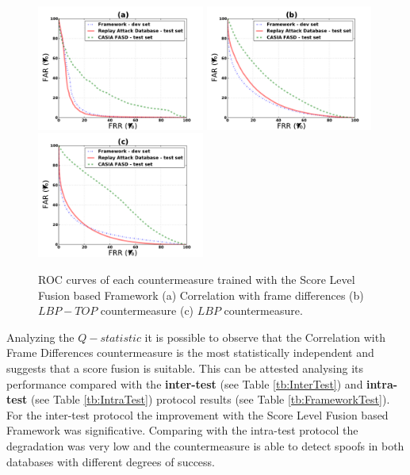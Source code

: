 \begin{figure}[ht]
\begin{center}

\includegraphics [width=5.5cm] {plots/FRAMEWORK/MOTION/SUM.pdf} 
\includegraphics [width=5.5cm] {plots/FRAMEWORK/LBPTOP/SUM.pdf}
\includegraphics [width=5.5cm] {plots/FRAMEWORK/LBP/SUM.pdf}

\caption{ROC curves of each countermeasure trained with the Score Level Fusion based Framework (a) Correlation with frame differences (b) $LBP-TOP$ countermeasure (c) $LBP$ countermeasure.} 
\label{fig:ROC_framework}
\end{center}
\end{figure}

Analyzing the $Q-statistic$ it is  possible to observe that the Correlation with Frame Differences countermeasure is the most statistically independent and suggests that a score fusion is suitable. This can be attested analysing its performance compared with the \textbf{inter-test} (see Table \ref{tb:InterTest}) and \textbf{intra-test} (see Table \ref{tb:IntraTest}) protocol results (see Table \ref{tb:FrameworkTest}). For the inter-test protocol the improvement with the Score Level Fusion based Framework was significative. Comparing with the intra-test protocol the degradation was very low and the countermeasure is able to detect spoofs in both databases with different degrees of success.

